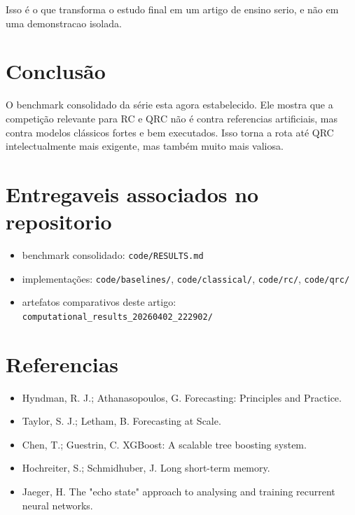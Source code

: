 \documentclass[12pt]{article}
\providecommand{\tightlist}{%
          \setlength{\itemsep}{0pt}\setlength{\parskip}{0pt}}
\begin{document}
Isso é o que transforma o estudo final em um artigo de ensino serio, e não em uma demonstracao isolada.

\section{Conclusão}\label{11-conclusuxe3o}

O benchmark consolidado da série esta agora estabelecido. Ele mostra que a competição relevante para RC e QRC não é contra referencias artificiais, mas contra modelos clássicos fortes e bem executados. Isso torna a rota até QRC intelectualmente mais exigente, mas também muito mais valiosa.

\section{Entregaveis associados no repositorio}\label{entregaveis-associados-no-repositorio}

\begin{itemize}
\tightlist
\item
  benchmark consolidado: \texttt{code/RESULTS.md}
\item
  implementações: \texttt{code/baselines/}, \texttt{code/classical/}, \texttt{code/rc/}, \texttt{code/qrc/}
\item
  artefatos comparativos deste artigo: \texttt{computational\_results\_20260402\_222902/}
\end{itemize}

\section{Referencias}\label{referencias}

\begin{itemize}
\tightlist
\item
  Hyndman, R. J.; Athanasopoulos, G. Forecasting: Principles and Practice.
\item
  Taylor, S. J.; Letham, B. Forecasting at Scale.
\item
  Chen, T.; Guestrin, C. XGBoost: A scalable tree boosting system.
\item
  Hochreiter, S.; Schmidhuber, J. Long short-term memory.
\item
  Jaeger, H. The "echo state" approach to analysing and training recurrent neural networks.
\end{itemize}

        
\end{document}
